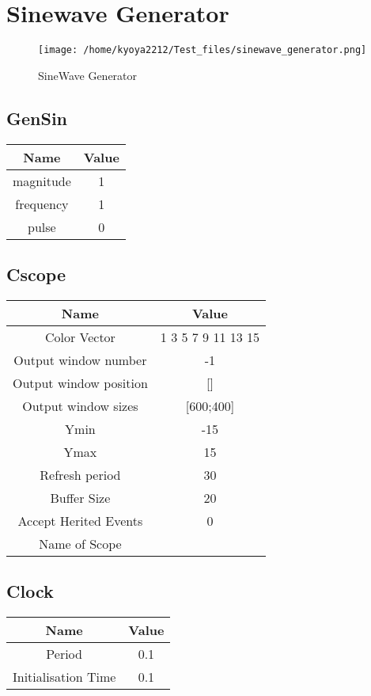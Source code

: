 \documentclass{article}%
\begin{document}
%
\normalsize%
\section{Sinewave Generator}%
\label{sec:Sinewave Generator}%


\begin{figure}[h!]%
\centering%
\texttt{[image: /home/kyoya2212/Test\_files/sinewave\_generator.png]}%
\caption{SineWave Generator}%
\end{figure}

%
\subsection{GenSin}%
\label{subsec:GenSin}%
\begin{tabular}{|c|c|}%
\hline%
Name&Value\\%
\hline%
magnitude&1\\%
\hline%
frequency&1\\%
\hline%
pulse&0\\%
\hline%
\end{tabular}

%
\subsection{Cscope}%
\label{subsec:Cscope}%
\begin{tabular}{|c|c|}%
\hline%
Name&Value\\%
\hline%
Color Vector&1 3 5 7 9 11 13 15\\%
\hline%
Output window number&{-}1\\%
\hline%
Output window position&{[}{]}\\%
\hline%
Output window sizes&{[}600;400{]}\\%
\hline%
Ymin&{-}15\\%
\hline%
Ymax&15\\%
\hline%
Refresh period&30\\%
\hline%
Buffer Size&20\\%
\hline%
Accept Herited Events&0\\%
\hline%
Name of Scope&\\%
\hline%
\end{tabular}

%
\subsection{Clock}%
\label{subsec:Clock}%
\begin{tabular}{|c|c|}%
\hline%
Name&Value\\%
\hline%
Period&0.1\\%
\hline%
Initialisation Time&0.1\\%
\hline%
\end{tabular}

%
\end{document}
